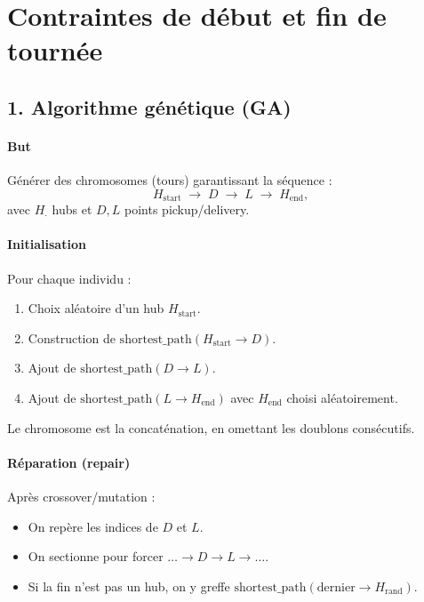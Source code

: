 \documentclass[11pt,a4paper]{article}
\begin{document}
\section{Contraintes de début et fin de tournée}

\subsection{1. Algorithme génétique (GA)}
\label{subsec:GA_constraints}

\paragraph{But} Générer des chromosomes (tours) garantissant la séquence :
\[
  H_{\text{start}} \;\to\; D \;\to\; L \;\to\; H_{\text{end}},
\]
avec \(H_{\cdot}\) hubs et \(D,L\) points pickup/delivery.

\paragraph{Initialisation} Pour chaque individu :
\begin{enumerate}
  \item Choix aléatoire d'un hub \(H_{\text{start}}\).
  \item Construction de \(\mathrm{shortest\_path}(H_{\text{start}}\to D)\).
  \item Ajout de \(\mathrm{shortest\_path}(D\to L)\).
  \item Ajout de \(\mathrm{shortest\_path}(L\to H_{\text{end}})\) avec \(H_{\text{end}}\) choisi aléatoirement.
\end{enumerate}
Le chromosome est la concaténation, en omettant les doublons consécutifs.

\paragraph{Réparation (repair)} Après crossover/mutation :
\begin{itemize}
  \item On repère les indices de \(D\) et \(L\).
  \item On sectionne pour forcer \( \dots\to D\to L\to\dots\).
  \item Si la fin n'est pas un hub, on y greffe \(\mathrm{shortest\_path}(\text{dernier}\to H_{\text{rand}})\).
\end{itemize}
\end{document}
